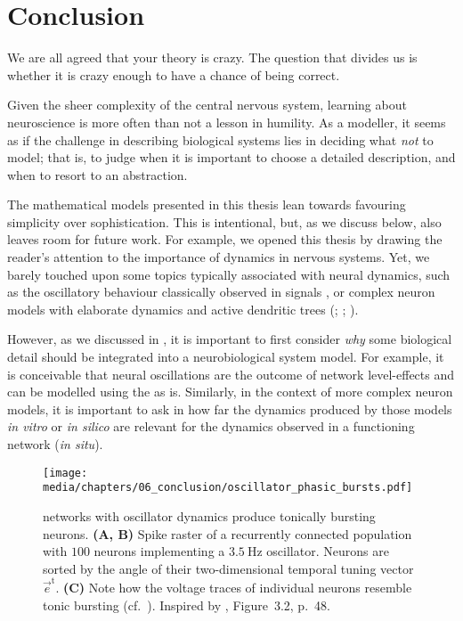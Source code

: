 
\chapter{Conclusion}
\label{chp:conclusion}

\begin{OpeningQuote}
We are all agreed that your theory is crazy. The question that divides us is whether it is crazy enough to have a chance of being correct.
\end{OpeningQuote}

Given the sheer complexity of the central nervous system, learning about neuroscience is more often than not a lesson in humility.
As a modeller, it seems as if the challenge in describing biological systems lies in deciding what \emph{not} to model; that is, to judge when it is important to choose a detailed description, and when to resort to an abstraction.

The mathematical models presented in this thesis lean towards favouring simplicity over sophistication.
This is intentional, but, as we discuss below, also leaves room for future work.
For example, we opened this thesis by drawing the reader's attention to the importance of dynamics in nervous systems.
Yet, we barely touched upon some topics typically associated with neural dynamics, such as the oscillatory behaviour classically observed in \EEG signals \citep[Chapter~8]{lopesdasilva2009electroencephalography,gerstner2002spiking}, or complex neuron models with elaborate dynamics and active dendritic trees (; \cite{izhikevich2007dynamical}; \cite{london2005dendritic}).

However, as we discussed in , it is important to first consider \emph{why} some biological detail should be integrated into a neurobiological system model.
For example, it is conceivable that neural oscillations are the outcome of network level-effects and can be modelled using the \NEF as is.
Similarly, in the context of more complex neuron models, it is important to ask in how far the dynamics produced by those models \emph{in vitro} or \emph{in silico} are relevant for the dynamics observed in a functioning network (\emph{in situ}).

\begin{figure}
	\centering
	\texttt{[image: media/chapters/06\_conclusion/oscillator\_phasic\_bursts.pdf]}
	\caption[NEF networks with oscillator dynamics produce tonically bursting neurons]{\NEF networks with oscillator dynamics produce tonically bursting neurons.
	\textbf{(A, B)} Spike raster of a recurrently connected \NEF population with $100$ neurons implementing a $\SI{3.5}{\hertz}$ oscillator.
	Neurons are sorted by the angle of their two-dimensional temporal tuning vector $\vec e^\mathrm{t}$.
	\textbf{(C)} Note how the voltage traces of individual neurons resemble tonic bursting (cf.~).
	Inspired by \citet{voelker2019}, Figure~3.2, p.~48.
	}
	\label{fig:oscillator_phasic_bursts}
\end{figure}

